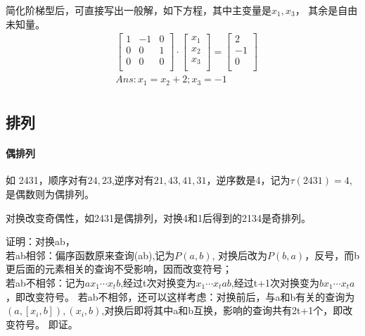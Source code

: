 \documentclass[UTF8]{../../09-Mathematics}
\begin{document}
简化阶梯型后，可直接写出一般解，如下方程，其中主变量是$x_1, x_3$， 其余是自由未知量。
\begin{equation}
    \begin{split}
    & \begin{bmatrix}
            1 & -1 & 0\\
            0 & 0 & 1\\
            0 & 0 & 0\\
        \end{bmatrix}
        \cdot
        \begin{bmatrix}
            x_1 \\
            x_2 \\
            x_3\\
        \end{bmatrix}
        =
        \begin{bmatrix}
        2 \\
        -1 \\
        0 \\
        \end{bmatrix} \\
        &Ans: x_1 = x_2 + 2; x_3 = -1\\
    \end{split}
\end{equation}






\subsection{排列}

\paragraph{偶排列}

如 2431，顺序对有${24,23}$,逆序对有${21,43,41,31}$，逆序数是4，记为$\tau(2431) = 4 $,是偶数则为偶排列。

\begin{lemma}
    对换改变奇偶性，如2431是偶排列，对换4和1后得到的2134是奇排列。

    证明：对换ab，\\
    若ab相邻：偏序函数原来查询(ab),记为$P(a,b)$, 对换后改为$P(b,a)$，反号，而b更后面的元素相关的查询不受影响，因而改变符号；\\
    若ab不相邻：记为$a x_1 \cdots x_t b$,经过t次对换变为$ x_1 \cdots x_ta b$,经过t+1次对换变为$ bx_1 \cdots x_ta $，即改变符号。
    若ab不相邻，还可以这样考虑：对换前后，与a和b有关的查询为$(a,[x_i, b]), (x_i,b)$,对换后即将其中a和b互换，影响的查询共有2t+1个，即改变符号。
    即证。
\end{lemma}
\end{document}
